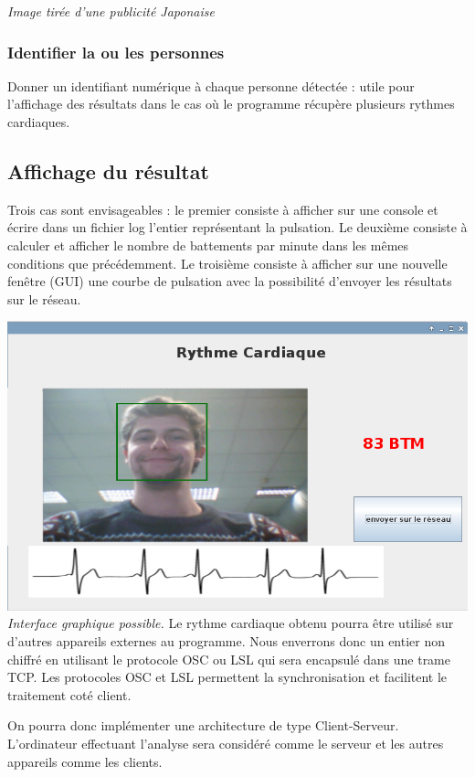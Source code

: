\documentclass[12pt,a4paper]{article}
\begin{document}
\textit{Image tirée d'une publicité Japonaise
}
\subsubsection{Identifier la ou les personnes}

Donner un identifiant numérique à chaque personne détectée : utile pour l'affichage des résultats dans le cas où le programme récupère plusieurs rythmes cardiaques.


\subsection{Affichage du résultat}

Trois cas sont envisageables : le premier consiste à afficher sur une console et écrire dans un fichier log l'entier représentant la pulsation.
Le deuxième consiste à calculer et afficher le nombre de battements par minute dans les mêmes conditions que précédemment. Le troisième consiste à afficher sur une nouvelle fenêtre (GUI) une courbe de pulsation avec la possibilité d'envoyer les résultats sur le réseau.\newline

 \includegraphics[scale=0.5]{gui.png}
\textit{Interface graphique possible.}
\newpage
Le rythme cardiaque obtenu pourra être utilisé sur d'autres appareils externes au programme. 
Nous enverrons donc un entier non chiffré en utilisant le protocole OSC ou LSL qui sera encapsulé dans une trame TCP. Les protocoles OSC et LSL permettent la synchronisation et facilitent le traitement coté client.

On pourra donc implémenter une architecture de type Client-Serveur. L'ordinateur effectuant l'analyse sera considéré comme le serveur et les autres appareils comme les clients.
\end{document}
